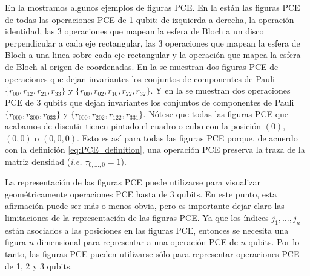 
En la  mostramos algunos ejemplos de figuras PCE. 
En la  están las figuras PCE de todas 
las operaciones PCE de 1 qubit: de izquierda a derecha, la operación identidad, las 
3 operaciones que mapean la esfera de Bloch a un disco perpendicular a cada
eje rectangular, las 3 operaciones que mapean la esfera de Bloch a una linea
sobre cada eje rectangular y la operación que mapea la esfera 
de Bloch al origen de coordenadas. En la 
se muestran dos figuras PCE de operaciones que dejan invariantes
los conjuntos de componentes de Pauli $\{r_{00},r_{12},r_{21},r_{33}\}$ y 
$\{r_{00},r_{02},r_{10},r_{22},r_{32}\}$. Y en la 
 se muestran dos operaciones PCE de 3 qubits
que dejan invariantes los conjuntos de componentes de Pauli $\{r_{000},
r_{300}, r_{033}\}$ y $\{r_{000},r_{202},r_{122}, r_{331}\}$.
Nótese que todas las figuras PCE que acabamos de discutir  
tienen pintado el cuadro o cubo con la posición $(0)$, $(0,0)$ o $(0,0,0)$.
Esto es así para todas las figuras PCE porque, de acuerdo con la definición 
\eqref{eq:PCE_definition}, una operación PCE preserva la traza de 
la matriz densidad (\textit{i.e.} $\tau_{0,\ldots,0}=1$).


La representación de las figuras PCE puede utilizarse para visualizar geométricamente 
operaciones PCE hasta de 3 qubits. En este punto, esta afirmación puede 
ser más o menos obvia, pero es importante dejar claro las limitaciones de 
la representación de las figuras PCE. 
Ya que los índices $j_1,\ldots,j_n$ están asociados a las posiciones 
en las figuras PCE, entonces se necesita una figura $n$ dimensional para representar 
a una operación PCE de $n$ qubits. Por lo tanto, las figuras PCE pueden
utilizarse sólo para representar operaciones PCE de 1, 2 y 3 qubits. 


